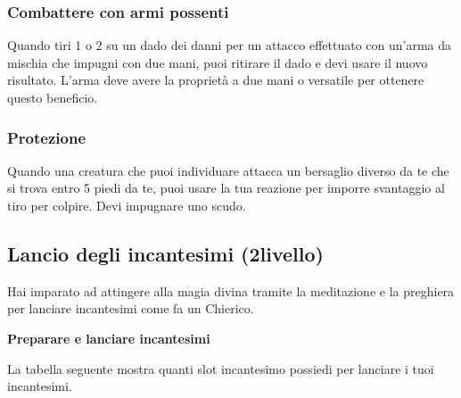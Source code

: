 \documentclass[a4paper,10pt,twoside,twocolumn,openany,bg=full,nodeprecatedcode]{dndbook}
\begin{document}
\subsubsection{Combattere con armi possenti}
Quando tiri 1 o 2 su un dado dei danni per un attacco effettuato con un'arma da mischia che impugni con due mani, puoi ritirare il dado e devi usare il nuovo risultato.
L'arma deve avere la proprietà a due mani o versatile per ottenere questo beneficio.

\subsubsection{Protezione}
Quando una creatura che puoi individuare attacca un bersaglio diverso da te che si trova entro 5 piedi da te, puoi usare la tua reazione per imporre svantaggio al tiro per colpire.
Devi impugnare uno scudo.

\subsection{Lancio degli incantesimi (2\degree livello)}

Hai imparato ad attingere alla magia divina tramite la meditazione e la preghiera per lanciare incantesimi come fa un Chierico.

\textbf{Preparare e lanciare incantesimi}

La tabella seguente mostra quanti slot incantesimo possiedi per lanciare i tuoi incantesimi.
\end{document}
